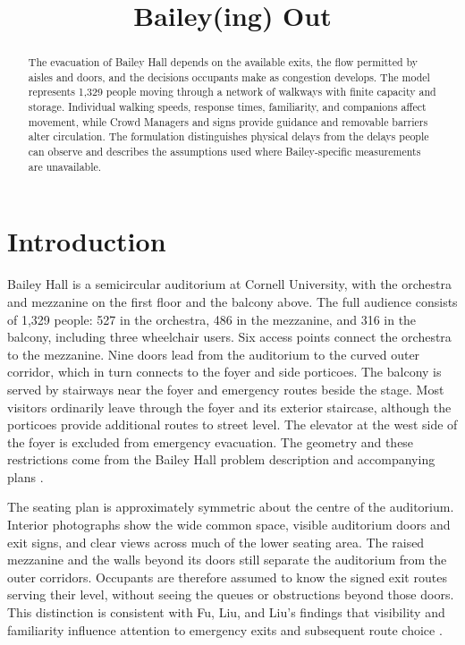 \documentclass[11pt,a4paper]{article}
\title{Bailey(ing) Out}
\author{}
\date{}
\begin{document}
\maketitle
\vspace{-2em}

\begin{abstract}
The evacuation of Bailey Hall depends on the available exits, the flow permitted by aisles and doors, and the decisions occupants make as congestion develops. The model represents 1,329 people moving through a network of walkways with finite capacity and storage. Individual walking speeds, response times, familiarity, and companions affect movement, while Crowd Managers and signs provide guidance and removable barriers alter circulation. The formulation distinguishes physical delays from the delays people can observe and describes the assumptions used where Bailey-specific measurements are unavailable.
\end{abstract}

\section{Introduction}

Bailey Hall is a semicircular auditorium at Cornell University, with the orchestra and mezzanine on the first floor and the balcony above. The full audience consists of 1,329 people: 527 in the orchestra, 486 in the mezzanine, and 316 in the balcony, including three wheelchair users. Six access points connect the orchestra to the mezzanine. Nine doors lead from the auditorium to the curved outer corridor, which in turn connects to the foyer and side porticoes. The balcony is served by stairways near the foyer and emergency routes beside the stage. Most visitors ordinarily leave through the foyer and its exterior staircase, although the porticoes provide additional routes to street level. The elevator at the west side of the foyer is excluded from emergency evacuation. The geometry and these restrictions come from the Bailey Hall problem description and accompanying plans \cite{brief}.

The seating plan is approximately symmetric about the centre of the auditorium. Interior photographs show the wide common space, visible auditorium doors and exit signs, and clear views across much of the lower seating area. The raised mezzanine and the walls beyond its doors still separate the auditorium from the outer corridors. Occupants are therefore assumed to know the signed exit routes serving their level, without seeing the queues or obstructions beyond those doors. This distinction is consistent with Fu, Liu, and Liu's findings that visibility and familiarity influence attention to emergency exits and subsequent route choice \cite{brief,fu2023,fu2024}.
\end{document}
